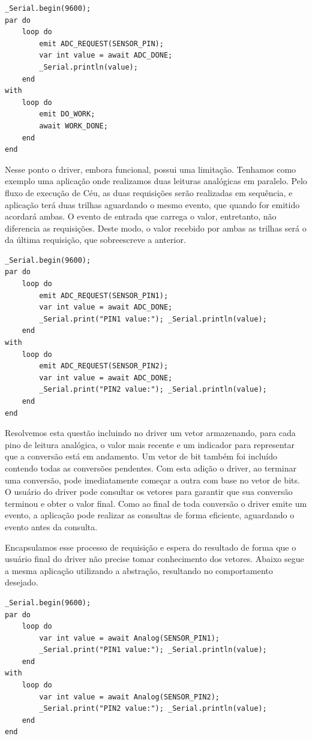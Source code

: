 \documentclass[11pt]{article}
\begin{document}
\begin{lstlisting}[style=CStyle,label=analogceu,caption=Aplicação utilizando driver em Céu]
_Serial.begin(9600);
par do
    loop do
        emit ADC_REQUEST(SENSOR_PIN);
        var int value = await ADC_DONE;
        _Serial.println(value);
    end
with
    loop do
        emit DO_WORK;
        await WORK_DONE;
    end
end
\end{lstlisting}
\par Nesse ponto o driver, embora funcional, possui uma limitação. Tenhamos como exemplo uma aplicação onde realizamos duas leituras analógicas em paralelo. Pelo fluxo de execução de Céu, as duas requisições serão realizadas em sequência, e aplicação terá duas trilhas aguardando o mesmo evento, que quando for emitido acordará ambas. O evento de entrada que carrega o valor, entretanto, não diferencia as requisições. Deste modo, o valor recebido por ambas as trilhas será o da última requisição, que sobreescreve a anterior.
\begin{lstlisting}[style=CStyle,label=analogceutwo1,caption=Duas leituras analógicas concorrentes não suportadas]
_Serial.begin(9600);
par do
    loop do
        emit ADC_REQUEST(SENSOR_PIN1);
        var int value = await ADC_DONE;
        _Serial.print("PIN1 value:"); _Serial.println(value);
    end
with
    loop do
        emit ADC_REQUEST(SENSOR_PIN2);
        var int value = await ADC_DONE;
        _Serial.print("PIN2 value:"); _Serial.println(value);
    end
end
\end{lstlisting}
\par Resolvemos esta questão incluindo no driver um vetor armazenando, para cada pino de leitura analógica, o valor mais recente e um indicador para representar que a conversão está em andamento. Um vetor de bit também foi incluído contendo todas as conversões pendentes. Com esta adição o driver, ao terminar uma conversão, pode imediatamente começar a outra com base no vetor de bits. O usuário do driver pode consultar os vetores para garantir que sua conversão terminou e obter o valor final. Como ao final de toda conversão o driver emite um evento, a aplicação pode realizar as consultas de forma eficiente, aguardando o evento antes da consulta. 
\par Encapsulamos esse processo de requisição e espera do resultado de forma que o usuário final do driver não precise tomar conhecimento dos vetores. Abaixo segue a mesma aplicação utilizando a abstração, resultando no comportamento desejado.
\begin{lstlisting}[style=CStyle,label=analogceutwo2,caption=Duas leituras analógicas concorrentes utilizando a abstração]
_Serial.begin(9600);
par do
    loop do
        var int value = await Analog(SENSOR_PIN1);
        _Serial.print("PIN1 value:"); _Serial.println(value);
    end
with
    loop do
        var int value = await Analog(SENSOR_PIN2);
        _Serial.print("PIN2 value:"); _Serial.println(value);
    end
end
\end{lstlisting}
\end{document}
